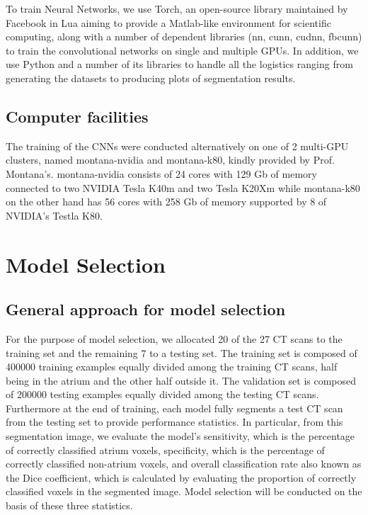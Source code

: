\noindent To train Neural Networks, we use Torch, an open-source library maintained by Facebook in Lua aiming to provide a Matlab-like environment for scientific computing, along with a number of dependent libraries (nn, cunn, cudnn, fbcunn) to train the convolutional networks on single and multiple GPUs. In addition, we use Python and a number of its libraries to handle all the logistics ranging from generating the datasets to producing plots of segmentation results.

\subsection{Computer facilities}

\noindent The training of the CNNs were conducted alternatively on one of 2 multi-GPU clusters, named montana-nvidia and montana-k80, kindly provided by Prof. Montana's. montana-nvidia consists of 24 cores with 129 Gb of memory connected to two NVIDIA Tesla K40m and two Tesla K20Xm while montana-k80 on the other hand has 56 cores with 258 Gb of memory supported by 8 of NVIDIA's Testla K80. 

\section{Model Selection}

\subsection{General approach for model selection}

\noindent For the purpose of model selection, we allocated 20 of the 27 CT scans to the training set and the remaining 7 to a testing set. The training set is composed of 400000 training examples equally divided among the training CT scans, half being in the atrium and the other half outside it. The validation set is composed of 200000 testing examples equally divided among the testing CT scans. Furthermore at the end of training, each model fully segments a test CT scan from the testing set to provide performance statistics. In particular, from this segmentation image, we evaluate the model's sensitivity, which is the percentage of correctly classified atrium voxels, specificity, which is the percentage of correctly classified non-atrium voxels, and overall classification rate also known as the Dice coefficient, which is calculated by evaluating the proportion of correctly classified voxels in the segmented image. Model selection will be conducted on the basis of these three statistics.\\

